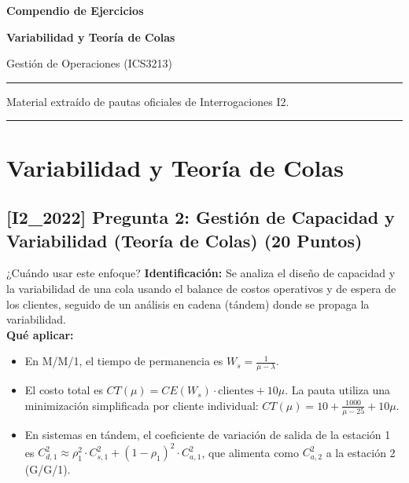 \documentclass[11pt, a4paper]{article}
\begin{document}
\begin{titlepage}
  \centering
  \vspace*{2cm}
  {\Huge\bfseries\color{gopcyan} Compendio de Ejercicios\par}
  \vspace{0.4cm}
  {\LARGE\bfseries Variabilidad y Teoría de Colas\par}
  \vspace{0.3cm}
  {\large Gestión de Operaciones (ICS3213)\par}
  \vspace{1.2cm}
  \rule{\textwidth}{0.4pt}
  \vspace{0.4cm}
  {\small Material extraído de pautas oficiales de Interrogaciones I2.\par}
  \vspace{0.4cm}
  \rule{\textwidth}{0.4pt}
  \vfill
\end{titlepage}

\newpage
\section*{Variabilidad y Teoría de Colas}

\subsection*{[I2_2022] Pregunta 2: Gestión de Capacidad y Variabilidad (Teoría de Colas) (20 Puntos)}
\begin{tipprueba}{¿Cuándo usar este enfoque?}
    \textbf{Identificación:} Se analiza el diseño de capacidad y la variabilidad de una cola usando el balance de costos operativos y de espera de los clientes, seguido de un análisis en cadena (tándem) donde se propaga la variabilidad.\\
    \textbf{Qué aplicar:}
    \begin{itemize}
      \item En M/M/1, el tiempo de permanencia es $W_s = \frac{1}{\mu - \lambda}$.
      \item El costo total es $CT(\mu) = CE(W_s) \cdot \text{clientes} + 10\mu$. La pauta utiliza una minimización simplificada por cliente individual: $CT(\mu) = 10 + \frac{1000}{\mu - 25} + 10\mu$.
      \item En sistemas en tándem, el coeficiente de variación de salida de la estación 1 es $C_{d,1}^2 \approx \rho_1^2 \cdot C_{s,1}^2 + (1-\rho_1)^2 \cdot C_{a,1}^2$, que alimenta como $C_{a,2}^2$ a la estación 2 (G/G/1).
    \end{itemize}
  \end{tipprueba}
\end{document}

